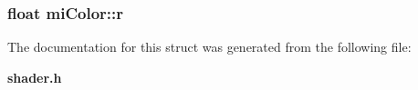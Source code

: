 \subsubsection{\setlength{\rightskip}{0pt plus 5cm}float {\bf mi\-Color::r}}\label{structmiColor_o0}




The documentation for this struct was generated from the following file:\begin{CompactItemize}
\item 
{\bf shader.h}\end{CompactItemize}

